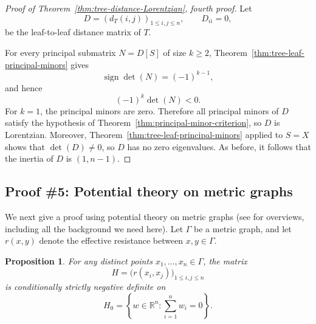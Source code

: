 \documentclass[12pt]{amsart}
\newtheorem{proposition}[theorem]{Proposition}
\theoremstyle{definition}
\newcommand{\1}{\mathbf{1}}
\newcommand\R{{\mathbb R}}
\begin{document}
\begin{proof}[Proof of Theorem~\ref{thm:tree-distance-Lorentzian}, fourth proof]
Let
\[
D=(d_T(i,j))_{1\le i,j\le n},
\qquad
D_{ii}=0,
\]
be the leaf-to-leaf distance matrix of $T$.

For every principal submatrix $N=D[S]$ of size $k\ge 2$,
Theorem~\ref{thm:tree-leaf-principal-minors} gives
\[
\operatorname{sign}\det(N)=(-1)^{k-1},
\]
and hence
\[
(-1)^k\det(N)<0.
\]
For $k=1$, the principal minors are zero.  Therefore all principal minors of $D$
satisfy the hypothesis of Theorem~\ref{thm:principal-minor-criterion}, so $D$ is
Lorentzian.
Moreover, Theorem~\ref{thm:tree-leaf-principal-minors} applied to $S=X$ shows that
$\det(D)\neq 0$, so $D$ has no zero eigenvalues.  
As before, it follows that the inertia of $D$ is $(1,n-1)$.
\end{proof}

\subsection{Proof \#5: Potential theory on metric graphs}
\label{app:potential-theory-proof}

We next give a proof using potential theory on metric graphs (see \cite{Baker-Faber06,Baker-Rumely07} for overviews, including all the background we need here).
Let $\Gamma$ be a metric graph, and let $r(x,y)$
denote the effective resistance between $x,y\in\Gamma$.

\begin{proposition}
\label{prop:effective-resistance-CND}
For any distinct points $x_1,\dots,x_n\in\Gamma$, the matrix
\[
H=\bigl(r(x_i,x_j)\bigr)_{1\le i,j\le n}
\]
is conditionally strictly negative definite on
\[
H_0=\left\{w\in\R^n:\sum_{i=1}^n w_i=0\right\}.
\]
\end{proposition}
\end{document}
